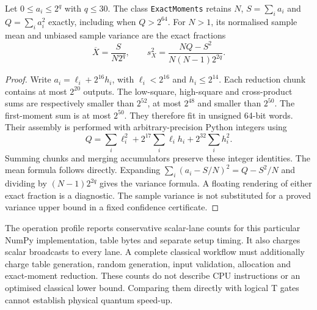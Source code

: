 \begin{proposition}
Let $0\leq a_i\leq2^q$ with $q\leq30$. The class
\texttt{ExactMoments} retains $N$, $S=\sum_i a_i$ and $Q=\sum_i a_i^2$
exactly, including when $Q>2^{64}$. For $N>1$, its normalised sample mean
and unbiased sample variance are the exact fractions
\[
 \overline X=\frac{S}{N2^q},\qquad
 s_X^2=\frac{NQ-S^2}{N(N-1)2^{2q}}.
\]
\end{proposition}
\begin{proof}
Write $a_i=\ell_i+2^{16}h_i$, with $\ell_i<2^{16}$ and
$h_i\leq2^{14}$. Each reduction chunk contains at most $2^{20}$ outputs.
The low-square, high-square and cross-product sums are respectively smaller
than $2^{52}$, at most $2^{48}$ and smaller than $2^{50}$. The first-moment
sum is at most $2^{50}$. They therefore fit in unsigned 64-bit words. Their
assembly is performed with arbitrary-precision Python integers using
\[
 Q=\sum_i\ell_i^2+2^{17}\sum_i\ell_i h_i+2^{32}\sum_i h_i^2.
\]
Summing chunks and merging accumulators preserve these integer identities.
The mean formula follows directly. Expanding
$\sum_i(a_i-S/N)^2=Q-S^2/N$ and dividing by $(N-1)2^{2q}$ gives the variance
formula. A floating rendering of either exact fraction is a diagnostic. The
sample variance is not substituted for a proved variance upper bound in a
fixed confidence certificate.
\end{proof}

The operation profile reports conservative scalar-lane counts for this
particular NumPy implementation, table bytes and separate setup timing. It
also charges scalar broadcasts to every lane. A complete classical workflow
must additionally charge table generation, random generation, input validation,
allocation and exact-moment reduction. These counts do not describe CPU
instructions or an optimised classical lower bound. Comparing them directly
with logical T gates cannot establish physical quantum speed-up.
